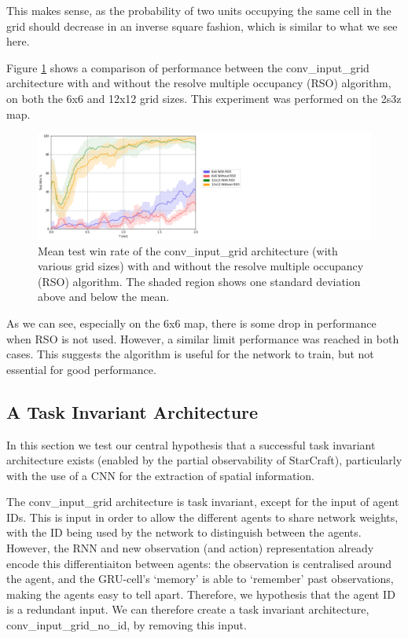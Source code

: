 This makes sense, as the probability of two units occupying the same cell in the grid should decrease in an inverse square fashion, which is similar to what we see here. 

Figure \ref{fig:multocc} shows a comparison of performance between the conv\_input\_grid architecture with and without the resolve multiple occupancy (RSO) algorithm, on both the 6x6 and 12x12 grid sizes. This experiment was performed on the 2s3z map.

\begin{figure}
    \centering
    \hbox{\hspace{5em}\includegraphics[scale=0.5]{images/graphs/mult_occ.png}}
    \caption{Mean test win rate of the conv\_input\_grid architecture (with various grid sizes) with and without the resolve multiple occupancy (RSO) algorithm. The shaded region shows one standard deviation above and below the mean.}
    \label{fig:multocc}
\end{figure}

As we can see, especially on the 6x6 map, there is some drop in performance when RSO is not used. However, a similar limit performance was reached in both cases. This suggests the algorithm is useful for the network to train, but not essential for good performance. 


\subsection{A Task Invariant Architecture}
In this section we test our central hypothesis that a successful task invariant architecture exists (enabled by the partial observability of StarCraft), particularly with the use of a CNN for the extraction of spatial information.

The conv\_input\_grid architecture is task invariant, except for the input of agent IDs. This is input in order to allow the different agents to share network weights, with the ID being used by the network to distinguish between the agents. However, the RNN and new observation (and action) representation already encode this differentiaiton between agents: the observation is centralised around the agent, and the GRU-cell's `memory' is able to `remember' past observations, making the agents easy to tell apart. Therefore, we hypothesis that the agent ID is a redundant input. We can therefore create a task invariant architecture, conv\_input\_grid\_no\_id, by removing this input.


